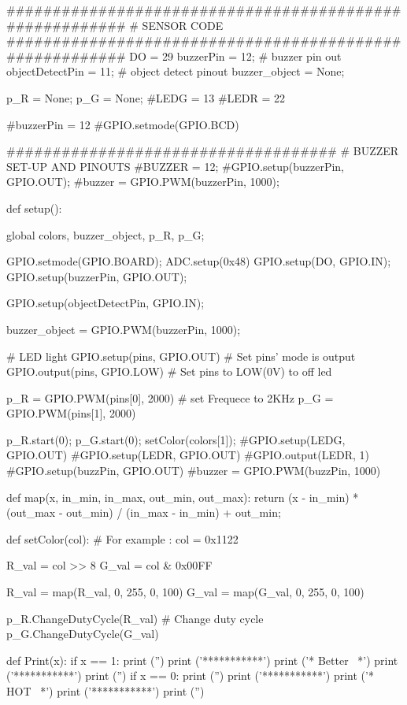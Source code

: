########################################################
# SENSOR CODE
########################################################
DO = 29
buzzerPin = 12; # buzzer pin out
objectDetectPin = 11; # object detect pinout
buzzer_object = None;


p_R = None;
p_G = None;
#LEDG = 13
#LEDR = 22

#buzzerPin = 12
#GPIO.setmode(GPIO.BCD)

####################################
# BUZZER SET-UP AND PINOUTS
#BUZZER = 12;
#GPIO.setup(buzzerPin, GPIO.OUT);
#buzzer = GPIO.PWM(buzzerPin, 1000);



def setup():
	
	global colors, buzzer_object, p_R, p_G;
	
	GPIO.setmode(GPIO.BOARD); 
	ADC.setup(0x48)
	GPIO.setup(DO, GPIO.IN);	  
	GPIO.setup(buzzerPin, GPIO.OUT);
	
	GPIO.setup(objectDetectPin, GPIO.IN);
	
	buzzer_object = GPIO.PWM(buzzerPin, 1000);
	
	
	
	# LED light
	GPIO.setup(pins, GPIO.OUT) # Set pins' mode is output
	GPIO.output(pins, GPIO.LOW) # Set pins to LOW(0V) to off led

	p_R = GPIO.PWM(pins[0], 2000) # set Frequece to 2KHz
	p_G = GPIO.PWM(pins[1], 2000)
	
	p_R.start(0); 
	p_G.start(0);
	setColor(colors[1]);
	#GPIO.setup(LEDG, GPIO.OUT)
	#GPIO.setup(LEDR, GPIO.OUT)
	#GPIO.output(LEDR, 1)
	#GPIO.setup(buzzPin, GPIO.OUT)
	#buzzer = GPIO.PWM(buzzPin, 1000)



def map(x, in_min, in_max, out_min, out_max):
	return (x - in_min) * (out_max - out_min) / (in_max - in_min) + out_min;
	


def setColor(col): # For example : col = 0x1122
	
	R_val = col >> 8
	G_val = col & 0x00FF


	R_val = map(R_val, 0, 255, 0, 100)
	G_val = map(G_val, 0, 255, 0, 100)

	p_R.ChangeDutyCycle(R_val) # Change duty cycle
	p_G.ChangeDutyCycle(G_val)


	

def Print(x):
	if x == 1:
		print ('')
		print ('***********')
		print ('* Better~ *')
		print ('***********')
		print ('')
	if x == 0:
		print ('')
		print ('***********')
		print ('* HOT~    *')
		print ('***********')
		print ('')





